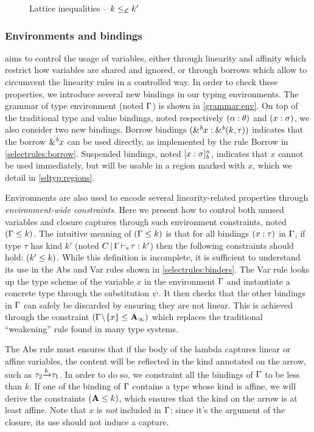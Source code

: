 \begin{figure*}[!h]
  
  \caption{Lattice inequalities -- $k \leq_\mathcal L k'$}
  \label{sdtyp:lattice}
\end{figure*}


\subsubsection{Environments and bindings}

\lang aims to control the usage of variables, either
through
linearity and affinity which restrict how variables are shared and ignored,
or through borrows which allow to circumvent the linearity rules
in a controlled way.
In order to check these properties, we introduce several new bindings
in our typing environments.
The grammar of type environment (noted $\Gamma$) is shown in \cref{grammar:env}.
On top of the traditional type and value bindings, noted respectively
$(\alpha : \theta)$ and $(x : \sigma)$, we also consider two new
bindings.
Borrow bindings $({\&}^{\textit{b}}x : {\&}^{\textit{b}}(k,\tau))$ indicates
that the borrow ${\&}^{\textit{b}}x$ can be used directly, as implemented
by the rule {\sc Borrow} in \cref{selectrules:borrow}.
Suspended bindings, noted $[x : \sigma]_{\textit{b}}^n$, indicates that $x$
cannot be used immediately, but will be usable in a region
marked with $x$, which we detail in \cref{sdtyp:regions}.

Environments are also used to encode several linearity-related properties
through \emph{environment-wide constraints}.
Here we present how to control both unused variables and
closure captures through such environment constraints, noted $(\Gamma \leq k)$.
The intuitive meaning of $(\Gamma \leq k)$ is that for all bindings
$(x : \tau)$ in $\Gamma$,
if type $\tau$ has kind $k'$ (noted $C \operatorname{|} \Gamma \operatorname{\vdash_s} \tau : k'$)
then the following constraints should hold: $(k' \leq k)$.
While this definition is incomplete, it is sufficient to understand
its use in the {\sc Abs} and {\sc Var} rules shown in \cref{selectrules:binders}.
%
The {\sc Var} rule looks up the type scheme of the variable $x$ in
the environment $\Gamma$
and instantiate a concrete type through the substitution $\mathrm{\psi}$. It then
checks that the other bindings in $\Gamma$ can safely be discarded by
ensuring they are not linear. This is achieved through the constraint
$(\Gamma\!\setminus\!\{x\} \leq \mathbf{A}_\infty)$ which replaces the traditional
``weakening'' rule found in many type systems.

The {\sc Abs} rule must ensures that if the body of the lambda captures
linear or affine variables, the content will be reflected in the kind
annotated on the arrow, such as $\tau_2 {\xrightarrow{k}} \tau_1$.
In order to do so, we constraint all the bindings of $\Gamma$ to be less than $k$.
If one of the binding of $\Gamma$ contains a type whose kind is affine,
we will derive the constraints $(\mathbf{A} \leq k)$, which ensures that
the kind on the arrow is at least affine.
Note that $x$ is \emph{not} included in $\Gamma$: since it's the argument of the
closure, its use should not induce a capture.

